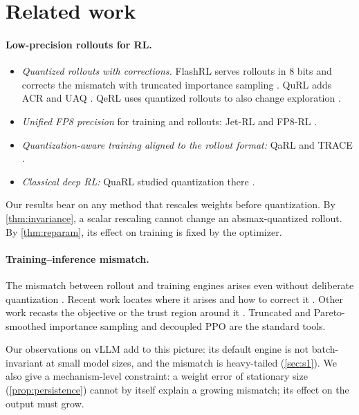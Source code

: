 \section{Related work}\label{sec:related}

\paragraph{Low-precision rollouts for RL.}
\begin{itemize}[leftmargin=*,itemsep=1pt]
\item \emph{Quantized rollouts with corrections.} FlashRL serves rollouts in 8 bits and corrects the mismatch with truncated importance sampling \citep{yao2025flashrl}. QuRL adds ACR and UAQ \citep{li2026qurl}. QeRL uses quantized rollouts to also change exploration \citep{huang2025qerl}.
\item \emph{Unified FP8 precision} for training and rollouts: Jet-RL and FP8-RL \citep{xi2026jetrl,qiu2026fp8rl}.
\item \emph{Quantization-aware training aligned to the rollout format:} QaRL and TRACE \citep{gu2026qarl,wang2026trace}.
\item \emph{Classical deep RL:} QuaRL studied quantization there \citep{krishnan2022quarl}.
\end{itemize}
Our results bear on any method that rescales weights before quantization. By \cref{thm:invariance}, a scalar rescaling cannot change an absmax-quantized rollout. By \cref{thm:reparam}, its effect on training is fixed by the optimizer.

\paragraph{Training--inference mismatch.} The mismatch between rollout and training engines arises even without deliberate quantization \citep{qi2025fp16,zheng2025stabilizing}. Recent work locates where it arises and how to correct it \citep{yu2026cis,zhong2026diagnosing}. Other work recasts the objective or the trust region around it \citep{liang2026mirage,li2025trm,qi2026dppo}. Truncated and Pareto-smoothed importance sampling \citep{ionides2008truncated,vehtari2024psis} and decoupled PPO \citep{hilton2022batch} are the standard tools.

Our observations on vLLM add to this picture: its default engine is not batch-invariant at small model sizes, and the mismatch is heavy-tailed (\cref{sec:s1}). We also give a mechanism-level constraint: a weight error of stationary size (\cref{prop:persistence}) cannot by itself explain a growing mismatch; its effect on the output must grow.

